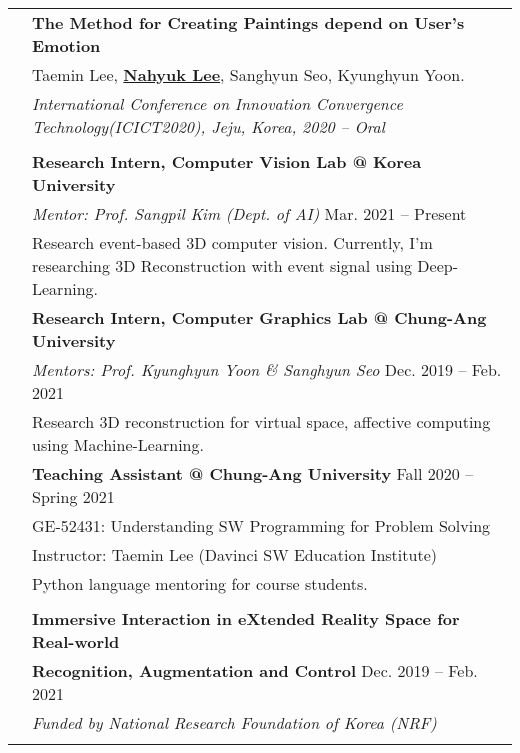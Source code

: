 \documentclass[letterpaper, 11pt]{article}
\begin{document}
\begin{longtable}{p{1.3in}p{4.8in}}
& \textbf{The Method for Creating Paintings depend on User's Emotion} \\
& Taemin Lee, \uline{\textbf{Nahyuk Lee}}, Sanghyun Seo, Kyunghyun Yoon. \\
& \textit{International Conference on Innovation Convergence Technology(ICICT2020), Jeju, Korea, 2020 -- Oral}\\
& \\



\nohyphens{\color{OliveGreen}{Research experience}} 
& \textbf{Research Intern, Computer Vision Lab @ Korea University} \\
& {\it Mentor: Prof. Sangpil Kim (Dept. of AI)} \hfill Mar. 2021 -- Present \\
& Research event-based 3D computer vision. Currently, I'm researching 3D Reconstruction with event signal using Deep-Learning.
& \\

& \textbf{Research Intern, Computer Graphics Lab @ Chung-Ang University} \\
& {\it Mentors: Prof. Kyunghyun Yoon \& Sanghyun Seo}  \hfill Dec. 2019 -- Feb. 2021 \\
& Research 3D reconstruction for virtual space, affective computing using Machine-Learning.
& \\


{\color{OliveGreen}{Teaching experience}} 
& \textbf{Teaching Assistant @ Chung-Ang University} \hfill Fall 2020 -- Spring 2021 \\
& GE-52431: Understanding SW Programming for Problem Solving \\
& Instructor: Taemin Lee (Davinci SW Education Institute) \\
& Python language mentoring for course students.\\
& \\



{\color{OliveGreen}{Project experience}} 
& {\textbf{Immersive Interaction in eXtended Reality Space for Real-world}} \\
& {\textbf{Recognition, Augmentation and Control}} \hfill Dec. 2019 -- Feb. 2021 \\
& {\it Funded by National Research Foundation of Korea (NRF)}  \\
& \\


\end{longtable}
\end{document}
